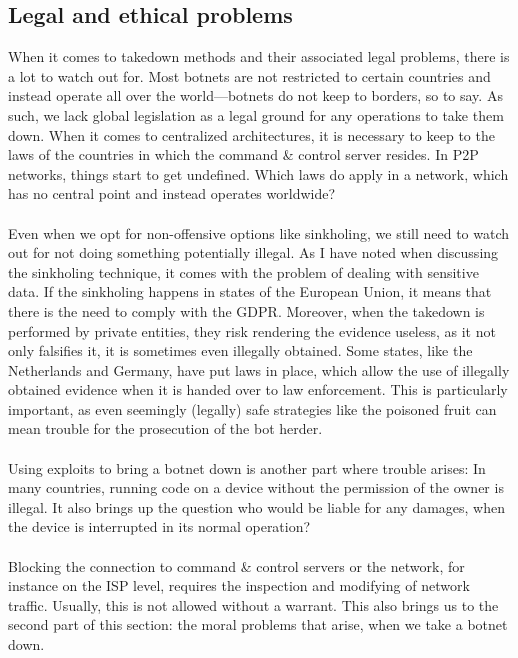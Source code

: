 \documentclass[10pt, a4paper, twocolumn]{article} %
\begin{document}
\subsection{Legal and ethical problems}\label{Legislature problems}
When it comes to takedown methods and their associated legal problems, there is a lot to watch out for. Most botnets are not restricted to certain countries and instead operate all over the world---botnets do not keep to borders, so to say. As such, we lack global legislation as a legal ground for any operations to take them down. When it comes to centralized architectures, it is necessary to keep to the laws of the countries in which the command \& control server resides. In P2P networks, things start to get undefined. Which laws do apply in a network, which has no central point and instead operates worldwide? \\\\
Even when we opt for non-offensive options like sinkholing, we still need to watch out for not doing something potentially illegal. As I have noted when discussing the sinkholing technique, it comes with the problem of dealing with sensitive data. If the sinkholing happens in states of the European Union, it means that there is the need to comply with the GDPR. Moreover, when the takedown is performed by private entities, they risk rendering the evidence useless, as it not only falsifies it, it is sometimes even illegally obtained. Some states, like the Netherlands and Germany, have put laws in place, which allow the use of illegally obtained evidence when it is handed over to law enforcement\cite{silverpath}. This is particularly important, as even seemingly (legally) safe strategies like the poisoned fruit can mean trouble for the prosecution of the bot herder. \\\\
Using exploits to bring a botnet down is another part where trouble arises: In many countries, running code on a device without the permission of the owner is illegal. It also brings up the question who would be liable for any damages, when the device is interrupted in its normal operation? \\\\
Blocking the connection to command \& control servers or the network, for instance on the ISP level, requires the inspection and modifying of network traffic. Usually, this is not allowed without a warrant. This also brings us to the second part of this section: the moral problems that arise, when we take a botnet down.\\\\
\end{document}
